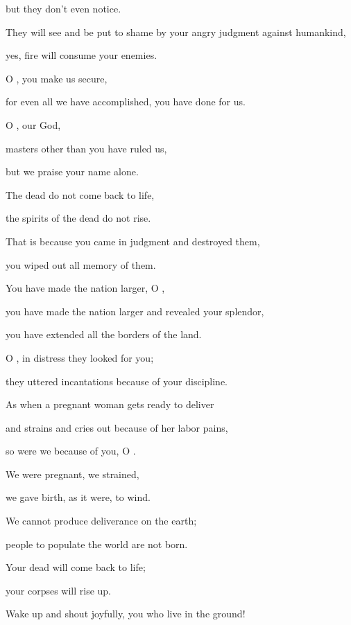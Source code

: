 {\par }{\Q but they don’t even notice.
\par }{\Q They will see
and be put to shame
by your angry
judgment against humankind,
\par }{\Q yes,
fire
will consume
your enemies.
\par }{\Q {}O
{}, you make us secure,
\par }{\Q for
even
all
we have accomplished,
you have done for us.
\par }{\Q {}O
{}, our God,
\par }{\Q masters
other than
you have ruled
us,
\par }{\Q but we praise
your name
alone.
\par }{\Q {}The dead
do not
come back to life,
\par }{\Q the spirits of the dead
do not
rise.
\par }{\Q That is because
you came in judgment
and destroyed
them,
\par }{\Q you wiped out
all
memory of them.
\par }{\Q {}You have made the nation
larger,
O
{},
\par }{\Q you have made the nation
larger
and revealed your splendor,

\par }{\Q you have extended
all
the borders
of the land.
\par }{\Q {}O
{}, in distress
they looked for
you;
\par }{\Q they uttered
incantations
because of your discipline.
\par }{\Q {}As when a pregnant woman
gets ready to deliver
\par }{\Q and strains
and cries
out because of her labor
pains,
\par }{\Q so
were we because
of you, O
{}.
\par }{\Q {}We were pregnant,
we strained,
\par }{\Q we gave birth,
as it were,
to wind.
\par }{\Q We cannot
produce deliverance
on the earth;
\par }{\Q people
to populate
the world
are not
born.
\par }{\Q Your dead
will come back to life;
\par }{\Q your corpses
will rise up.
\par }{\Q Wake up
and shout joyfully,
you who live
in the ground!

}

